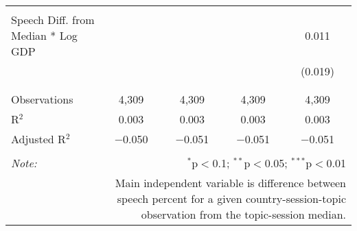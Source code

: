 \begin{table}[!htbp]
\begin{tabular}{@{\extracolsep{5pt}}lcccc}
  & & & & \\ 
 Speech Diff. from Median * Log GDP &  &  &  & 0.011 \\ 
  &  &  &  & (0.019) \\ 
  & & & & \\ 
\hline \\[-1.8ex] 
Observations & 4,309 & 4,309 & 4,309 & 4,309 \\ 
R$^{2}$ & 0.003 & 0.003 & 0.003 & 0.003 \\ 
Adjusted R$^{2}$ & $-$0.050 & $-$0.051 & $-$0.051 & $-$0.051 \\ 
\hline 
\hline \\[-1.8ex] 
\textit{Note:}  & \multicolumn{4}{r}{$^{*}$p$<$0.1; $^{**}$p$<$0.05; $^{***}$p$<$0.01} \\ 
 & \multicolumn{4}{r}{Main independent variable is difference between speech percent for a given country-session-topic observation from the topic-session median.} \\ 
\end{tabular} 
\end{table} 
